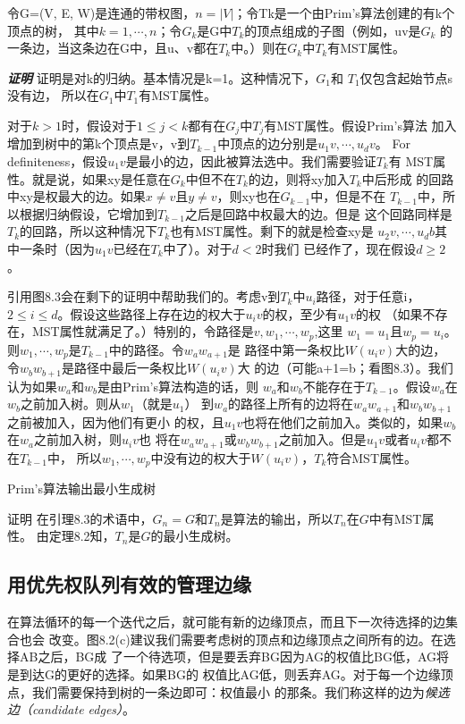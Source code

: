 \begin{lemma}
令G=(V, E, W)是连通的带权图，$n=|V|$；令Tk是一个由Prim's算法创建的有k个顶点的树，
其中$k=1, \cdots, n$；令$G_k$是G中$T_k$的顶点组成的子图（例如，uv是$G_k$
的一条边，当这条边在G中，且u、v都在$T_k$中。）则在$G_k$中$T_k$有MST属性。

{\textbf{\emph{证明}}} 证明是对k的归纳。基本情况是k=1。这种情况下，$G_1$和
$T_1$仅包含起始节点s没有边， 所以在$G_1$中$T_1$有MST属性。

对于$k>1$时，假设对于$1 \leq j < k$都有在$G_j$中$T_j$有MST属性。假设Prim's算法
加入增加到树中的第k个顶点是v，v到$T_{k-1}$中顶点的边分别是$u_1v, \cdots, u_dv$。
For definiteness，假设$u_1v$是最小的边，因此被算法选中。我们需要验证$T_k$有
MST属性。就是说，如果xy是任意在$G_k$中但不在$T_k$的边，则将xy加入$T_k$中后形成
的回路中xy是权最大的边。如果$x\neq v$且$y\neq v$，则xy也在$G_{k-1}$中，但是不在
$T_{k-1}$中，所以根据归纳假设，它增加到$T_{k-1}$之后是回路中权最大的边。但是
这个回路同样是$T_k$的回路，所以这种情况下$T_k$也有MST属性。剩下的就是检查xy是
$u_2v, \cdots, u_db$其中一条时（因为$u_1v$已经在$T_k$中了）。对于$d<2$时我们
已经作了，现在假设$d\geq 2$。

引用图8.3会在剩下的证明中帮助我们的。考虑v到$T_k$中$u_i$路径，对于任意i，
$2 \leq i \leq d$。假设这些路径上存在边的权大于$u_iv$的权，至少有$u_1v$的权
（如果不存在，MST属性就满足了。）特别的，令路径是$v, w_1, \cdots, w_p$,这里
$w_1=u_1$且$w_p=u_i$。则$w_1, \cdots, w_p$是$T_{k-1}$中的路径。令$w_aw_{a+1}$是
路径中第一条权比$W(u_iv)$大的边，令$w_bw_{b+1}$是路径中最后一条权比$W(u_iv)$大
的边（可能a+1=b；看图8.3）。我们认为如果$w_a$和$w_b$是由Prim's算法构造的话，则
$w_a$和$w_b$不能存在于$T_{k-1}$。假设$w_a$在$w_b$之前加入树。则从$w_1$（就是$u_1$）
到$w_a$的路径上所有的边将在$w_aw_{a+1}$和$w_bw_{b+1}$之前被加入，因为他们有更小
的权，且$u_1v$也将在他们之前加入。类似的，如果$w_b$在$w_a$之前加入树，则$u_iv$也
将在$w_aw_{a+1}$或$w_bw_{b+1}$之前加入。但是$u_1v$或者$u_iv$都不在$T_{k-1}$中，
所以$w_1, \cdots, w_p$中没有边的权大于$W(u_iv)$，$T_k$符合MST属性。
\end{lemma}

\begin{theorem}
Prim's算法输出最小生成树

证明 在引理8.3的术语中，$G_n=G$和$T_n$是算法的输出，所以$T_n$在$G$中有MST属性。
由定理8.2知，$T_n$是$G$的最小生成树。
\end{theorem}

\subsection{用优先权队列有效的管理边缘}\label{Sec:8_2_5}
在算法循环的每一个迭代之后，就可能有新的边缘顶点，而且下一次待选择的边集合也会
改变。图8.2(c)建议我们需要考虑树的顶点和边缘顶点之间所有的边。在选择AB之后，BG成
了一个待选项，但是要丢弃BG因为AG的权值比BG低，AG将是到达G的更好的选择。如果BG的
权值比AG低，则丢弃AG。对于每一个边缘顶点，我们需要保持到树的一条边即可：权值最小
的那条。我们称这样的边为\emph{候选边（candidate edges）}。


